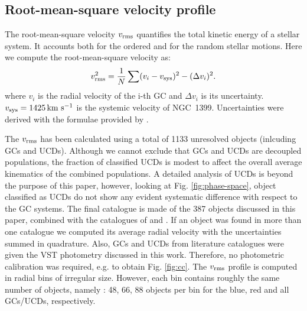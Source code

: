 \documentclass[useAMS,usenatbib]{mn2e}
\newcommand{\kms}{\mbox{\,km~s$^{-1}$}}
\begin{document}
\subsection{Root-mean-square velocity profile}
The root-mean-square velocity $v_{\rm rms}$ quantifies the total kinetic energy of a stellar system. It accounts both for the ordered and for the random stellar motions. Here we compute the root-mean-square velocity as:
\begin{equation}
v_{\rm rms}^2 = \frac{1}{N}  \sum (v_i - v_{\rm sys})^2 - (\Delta v_i)^2 .
\label{eq:sigma}
\end{equation}
where $v_i$ is the radial velocity of the i-th GC and $\Delta v_i$ is its uncertainty. $v_{\rm sys}=1425 \kms$ is the systemic velocity of NGC~1399. Uncertainties were derived with the formulae provided by \citet{Danese}. 

The $v_{\rm rms}$ has been calculated using a total of 1133 unresolved objects (inlcuding GCs and UCDs). Although we cannot exclude that GCs and UCDs are decoupled populations, 
the fraction of classified UCDs is modest to affect the overall average kinematics of the combined populations. A detailed analysis of UCDs is beyond the purpose of this paper,
however, looking at Fig. \ref{fig:phase-space}, object classified as UCDs do not show any evident systematic difference with respect to the GC systems. 
The final catalogue is made of the 387 objects discussed in this paper, combined with the catalogues of \citet{Bergond07} and \citet{Schuberth}. If an object was found in more than one catalogue we computed its average radial velocity with the uncertainties summed in quadrature. Also, GCs and UCDs from literature catalogues were given the VST photometry discussed in this work. Therefore, no photometric calibration was required, e.g. to obtain Fig. \ref{fig:cc}. The $v_{\rm rms}$ profile is computed in radial bins of irregular size. However, each bin contains roughly the same number of objects, namely : 48, 66, 88 objects per bin for the blue, red and all GCs/UCDs, respectively. 
\end{document}
